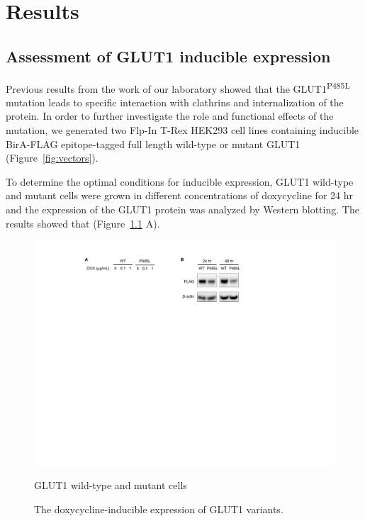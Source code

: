 
\chapter{Results} %
\label{Chapter3} %
\section{Assessment of GLUT1 inducible expression}
Previous results from the work of our laboratory showed that the GLUT1\textsuperscript{P485L} mutation leads to specific interaction with clathrins and internalization of the protein. In order to further investigate the role and functional effects of the mutation, we generated two Flp-In T-Rex HEK293 cell lines containing inducible BirA-FLAG epitope-tagged full length wild-type or mutant GLUT1 (Figure~\ref{fig:vectors}). 

To determine the optimal conditions for inducible expression, GLUT1 wild-type and mutant cells were grown in different concentrations of doxycycline for 24 hr and the expression of the GLUT1 protein was analyzed by Western blotting. The results showed that (Figure~\ref{fig:wb} A).
\begin{figure}[h]
\centering
\includegraphics[scale=0.7]{Figures/WB}
\caption{The doxycycline-inducible expression of GLUT1 variants.}
\medskip
\small \raggedright
GLUT1 wild-type and mutant cells
\label{fig:wb}
\end{figure}

